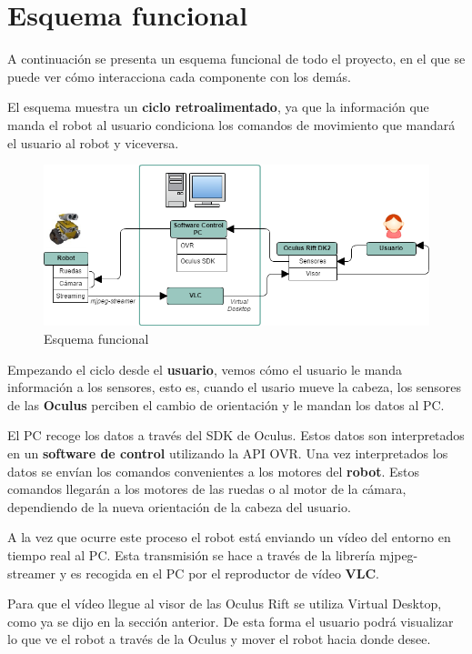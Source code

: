 \documentclass[twoside, 11pt]{epstfg}
\begin{document}
\section{Esquema funcional}
A continuación se presenta un esquema funcional de todo el proyecto, en el que se puede ver cómo interacciona cada componente con los demás.

El esquema muestra un \textbf{ciclo retroalimentado}, ya que la información que manda el robot al usuario condiciona los comandos de movimiento que mandará el usuario al robot y viceversa.

\begin{figure}[h]
	\centerline{
		\mbox{\includegraphics[width=1\textwidth]{images/EsquemaFuncional.png}}
	}
	\caption{Esquema funcional}
	\label{esquemaFuncional}
\end{figure}

Empezando el ciclo desde el \textbf{usuario}, vemos cómo el usuario le manda información a los sensores, esto es, cuando el usario mueve la cabeza, los sensores de las \textbf{Oculus} perciben el cambio de orientación y le mandan los datos al PC.

El PC recoge los datos a través del SDK de Oculus. Estos datos son interpretados en un \textbf{software de control} utilizando la API OVR. Una vez interpretados los datos se envían los comandos convenientes a los motores del \textbf{robot}. Estos comandos llegarán a los motores de las ruedas o al motor de la cámara, dependiendo de la nueva orientación de la cabeza del usuario.

A la vez que ocurre este proceso el robot está enviando un vídeo del entorno en tiempo real al PC. Esta transmisión se hace a través de la librería mjpeg-streamer y es recogida en el PC por el reproductor de vídeo \textbf{VLC}.

Para que el vídeo llegue al visor de las Oculus Rift se utiliza Virtual Desktop, como ya se dijo en la sección anterior. De esta forma el usuario podrá visualizar lo que ve el robot a través de la Oculus y mover el robot hacia donde desee.
\end{document}
